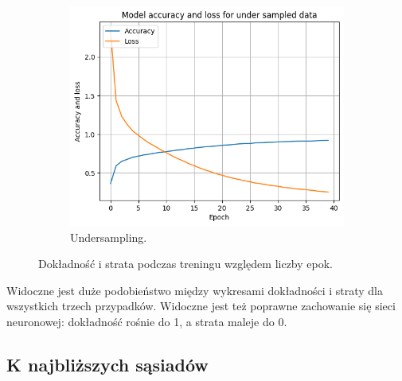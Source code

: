 \begin{figure}[H]
\begin{subfigure}{.33\textwidth}
        \centering
        \includegraphics[width=\textwidth]{img/under_acc_loss.png}
        \caption{Undersampling.}
        \label{fig:accu_loss_under}
    \end{subfigure}
    \caption{Dokładność i strata podczas treningu względem liczby epok.}
\end{figure}
Widoczne jest duże podobieństwo między wykresami dokładności i straty dla wszystkich trzech przypadków.
Widoczne jest też poprawne zachowanie się sieci neuronowej: dokładność rośnie do 1, a strata maleje do 0.
\subsection{K najbliższych sąsiadów}\label{sec:k_najblizszych_sasiadow}

